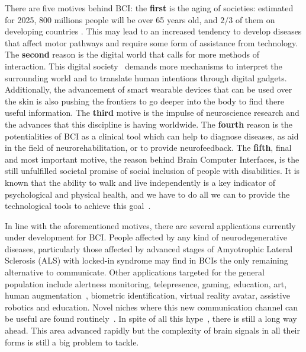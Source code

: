 
There are five motives behind BCI: the \textbf{first} is the aging of societies: estimated for 2025, 800 millions people will be over 65 years old, and $2/3$ of them on developing countries \cite{Lloyd-Sherlock2000}.  This may lead to an increased tendency to develop diseases that affect motor pathways and require some form of assistance from technology.  The \textbf{second} reason is the digital world that calls for more methods of interaction. This digital society~\cite{Dyson1998} demands more mechanisms to interpret the surrounding world and to translate human intentions through digital gadgets.  Additionally, the advancement of smart wearable devices that can be used over the skin is also pushing the frontiers to go deeper into the body to find there useful information.  The \textbf{third} motive is the impulse of neuroscience research and the advances that this discipline is having worldwide.  The \textbf{fourth} reason is the potentialities of BCI as a clinical tool which can help to diagnose diseases, as aid in the field of neurorehabilitation,  or to provide neurofeedback.  The \textbf{fifth}, final and most important motive, the reason behind Brain Computer Interfaces, is the still unfulfilled societal promise of social inclusion of people with disabilities.  It is known that the ability to walk and live independently is a key indicator of psychological and physical health, and we have to do all we can to provide the technological tools to achieve this goal~\cite{Rao2013,Clerc2016,WolpawJonathanR2012,Huggins2015}. 

In line with the aforementioned motives, there are several applications currently under development for BCI.  People affected by any kind of neurodegenerative diseases, particularly those affected by advanced stages of Amyotrophic Lateral Sclerosis (ALS) with locked-in syndrome may find in BCIs the only remaining alternative to communicate. Other applications targeted for the general population include alertness monitoring, telepresence, gaming, education, art, human augmentation~\cite{Yuste2017}, biometric identification, virtual reality avatar, assistive robotics and education.  Novel niches where this new communication channel can be useful are found routinely~\cite{Nam2018}. In spite of all this hype~\cite{GartnerHype2016}, there is still a long way ahead.  This area advanced rapidly but the complexity of brain signals in all their forms is still a big problem to tackle.  

